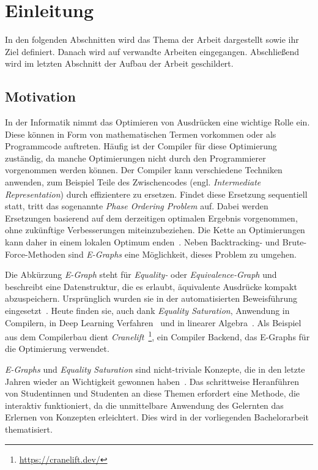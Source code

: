 \section{Einleitung}\label{sec:einleitung}

In den folgenden Abschnitten wird das Thema der Arbeit dargestellt sowie ihr Ziel definiert.
Danach wird auf verwandte Arbeiten eingegangen.
Abschließend wird im letzten Abschnitt der Aufbau der Arbeit geschildert.

\subsection{Motivation}

\noindent In der Informatik nimmt das Optimieren von Ausdrücken eine wichtige Rolle ein. 
Diese können in Form von mathematischen Termen vorkommen oder als Programmcode auftreten.
Häufig ist der Compiler für diese Optimierung zuständig, da manche Optimierungen nicht durch den Programmierer vorgenommen werden können. 
Der Compiler kann verschiedene Techniken anwenden, zum Beispiel Teile des Zwischencodes (engl. \textit{Intermediate Representation}) durch effizientere zu ersetzen.
Findet diese Ersetzung sequentiell statt, tritt das sogenannte \textit{Phase Ordering Problem} auf. 
Dabei werden Ersetzungen basierend auf dem derzeitigen optimalen Ergebnis vorgenommen, ohne zukünftige Verbesserungen miteinzubeziehen.
Die Kette an Optimierungen kann daher in einem lokalen Optimum enden~\cite{phaseorder-2009}.
Neben Backtracking- und Brute-Force-Methoden sind \textit{E-Graphs} eine Möglichkeit, dieses Problem zu umgehen. 

\noindent Die Abkürzung \textit{E-Graph} steht für \textit{Equality-} oder \textit{Equivalence-Graph} und beschreibt eine Datenstruktur, die es
erlaubt, äquivalente Ausdrücke kompakt abzuspeichern.
Ursprünglich wurden sie in der automatisierten Beweisführung eingesetzt~\cite{2021-egg}. Heute finden sie, auch dank \textit{Equality Saturation}, Anwendung in Compilern, in 
Deep Learning Verfahren~\cite{yang2021} und in linearer Algebra~\cite{wang2020}.
Als Beispiel aus dem Compilerbau dient \textit{Cranelift}~\footnote{\hspace{1.5mm}\url{https://cranelift.dev/}}, ein Compiler Backend, das E-Graphs für die Optimierung verwendet.

\noindent \textit{E-Graphs} und \textit{Equality Saturation} sind nicht-triviale Konzepte, die in den letzte Jahren wieder an Wichtigkeit gewonnen haben~\cite[S.~2]{eqsatexploration}.
Das schrittweise Heranführen von Studentinnen und Studenten an diese Themen erfordert eine Methode, die interaktiv funktioniert, da die unmittelbare Anwendung des Gelernten 
das Erlernen von Konzepten erleichtert. Dies wird in der vorliegenden Bachelorarbeit thematisiert. 
\newpage

